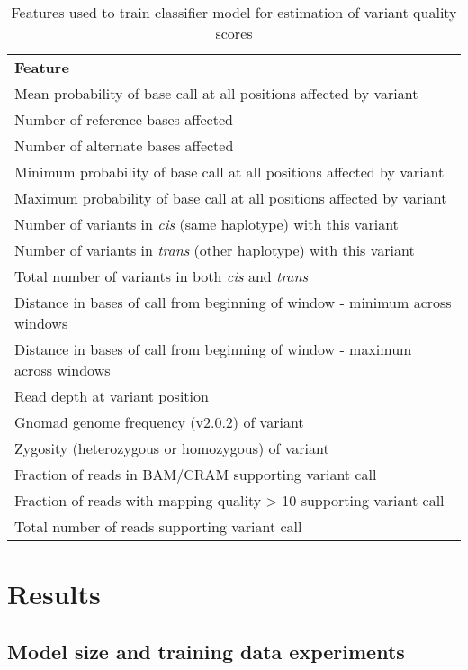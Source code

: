 \documentclass[]{article}
\begin{document}
\begin{center}
	\begin{table}
	\begin{tabular}{ l }
	 \textbf{Feature} \\
	 Mean probability of base call at all positions affected by variant \\ 
	 Number of reference bases affected \\
	 Number of alternate bases affected \\
	 Minimum probability of base call at all positions affected by variant \\
	 Maximum probability of base call at all positions affected by variant \\
	 Number of variants in \textit{cis} (same haplotype) with this variant \\
	 Number of variants in \textit{trans} (other haplotype) with this variant \\ 
	 Total number of variants in both \textit{cis} and \textit{trans} \\
	 Distance in bases of call from beginning of window - minimum across windows \\
	 Distance in bases of call from beginning of window - maximum across windows \\
	 Read depth at variant position \\
	 Gnomad genome frequency (v2.0.2) of variant \\
	 Zygosity (heterozygous or homozygous) of variant \\
	 Fraction of reads in BAM/CRAM supporting variant call \\
	 Fraction of reads with mapping quality > 10 supporting variant call \\
	 Total number of reads supporting variant call \\
	\end{tabular}
	\label{table:features}
	\caption{ Features used to train classifier model for estimation of variant quality scores }
\end{table}
\end{center}

\section{Results}

\subsection{Model size and training data experiments}
\end{document}
